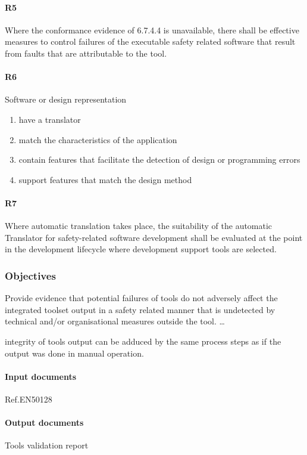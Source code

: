 \documentclass{template/openetcs_article}
\begin{document}
\paragraph{R5}
Where the conformance evidence of 6.7.4.4 is unavailable, there shall be effective measures to control failures of the executable safety related software that result from faults that are attributable to the tool.


\paragraph{R6}
Software or design representation

\begin{enumerate}
\item  have a translator
\item  match the characteristics of the application 
\item contain features that facilitate the detection of design or programming errors 
\item support features that match the design method
\end{enumerate}

\paragraph{R7}
Where automatic translation takes place, the suitability of the automatic Translator for safety-related software development shall be evaluated at the point in the development lifecycle where development support tools are selected.


\subsubsection{Objectives}
Provide evidence that potential failures of tools do not adversely affect the integrated toolset output in a safety related manner that is undetected by technical and/or organisational measures outside the tool. {\dots} 

integrity of tools output can be adduced by the same process steps as if the output was done in manual operation. 


\paragraph{Input documents}
Ref.EN50128


\paragraph{Output documents}
Tools validation report 
\end{document}
